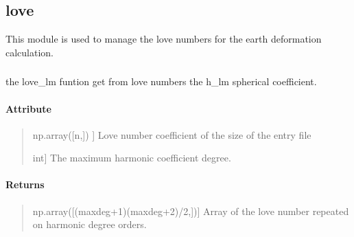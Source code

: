 \documentclass[letterpaper,10pt,english]{sphinxmanual}
\begin{document}
\sphinxstepscope


\subsection{love}
\label{\detokenize{love_doc:love}}\label{\detokenize{love_doc::doc}}
\sphinxAtStartPar
This module is used to manage the love numbers for the earth deformation calculation.


\subsubsection{}
\label{\detokenize{love_doc:functions}}

\begin{fulllineitems}
\label{\detokenize{love_doc:SL_C0de.love.love_lm}}
\pysigstartsignatures
{}
\pysigstopsignatures
\sphinxAtStartPar
the \label{\detokenize{love_doc:love-lm}}love\_lm funtion get from love numbers the h\_lm spherical coefficient.


\paragraph{Attribute}
\label{\detokenize{love_doc:attribute}}\begin{quote}
\begin{description}
\sphinxlineitem{num}{[}np.array({[}n,{]}) {]}
\sphinxAtStartPar
Love number coefficient of the size of the entry file

\sphinxlineitem{maxdeg}{[}int{]}
\sphinxAtStartPar
The maximum harmonic coefficient degree.

\end{description}
\end{quote}


\paragraph{Returns}
\label{\detokenize{love_doc:returns}}\begin{quote}
\begin{description}
\sphinxlineitem{h\_lm}{[}np.array({[}(maxdeg+1)(maxdeg+2)/2,{]}){]}
\sphinxAtStartPar
Array of the love number repeated on harmonic degree orders.

\end{description}
\end{quote}

\end{fulllineitems}
\end{document}
